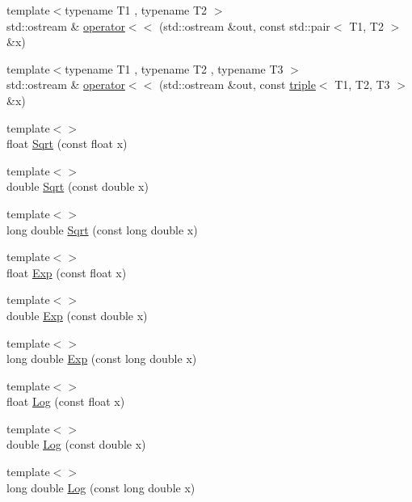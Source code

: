 \begin{DoxyCompactItemize}
\item 
{\footnotesize template$<$typename T1 , typename T2 $>$ }\\std\+::ostream \& \hyperlink{contrafold_2_utilities_8ipp_a90330689e9660b8e3f4720211e99792a}{operator$<$$<$} (std\+::ostream \&out, const std\+::pair$<$ T1, T2 $>$ \&x)
\item 
{\footnotesize template$<$typename T1 , typename T2 , typename T3 $>$ }\\std\+::ostream \& \hyperlink{contrafold_2_utilities_8ipp_a3d51e9fcc4b545214345eef0c3ecf3e8}{operator$<$$<$} (std\+::ostream \&out, const \hyperlink{structtriple}{triple}$<$ T1, T2, T3 $>$ \&x)
\item 
{\footnotesize template$<$$>$ }\\float \hyperlink{contrafold_2_utilities_8ipp_a8b3962d75e7f29b34971181b12f527da}{Sqrt} (const float x)
\item 
{\footnotesize template$<$$>$ }\\double \hyperlink{contrafold_2_utilities_8ipp_ae9fab1428944ba857cc4ceb4897c93a0}{Sqrt} (const double x)
\item 
{\footnotesize template$<$$>$ }\\long double \hyperlink{contrafold_2_utilities_8ipp_a819ff1297b5800fc0810ce49766400d9}{Sqrt} (const long double x)
\item 
{\footnotesize template$<$$>$ }\\float \hyperlink{contrafold_2_utilities_8ipp_a29d0fd4bdf4dc3019da5511afc7e3f92}{Exp} (const float x)
\item 
{\footnotesize template$<$$>$ }\\double \hyperlink{contrafold_2_utilities_8ipp_ad78e475abfaf2452e00e9f05199034f3}{Exp} (const double x)
\item 
{\footnotesize template$<$$>$ }\\long double \hyperlink{contrafold_2_utilities_8ipp_a41272df091ca16294c88ca5e8e4c6dfe}{Exp} (const long double x)
\item 
{\footnotesize template$<$$>$ }\\float \hyperlink{contrafold_2_utilities_8ipp_ad267663990a55841bfeaa3c5a05f8512}{Log} (const float x)
\item 
{\footnotesize template$<$$>$ }\\double \hyperlink{contrafold_2_utilities_8ipp_a12cdc7ac8943e306f00e1608e1d5b92d}{Log} (const double x)
\item 
{\footnotesize template$<$$>$ }\\long double \hyperlink{contrafold_2_utilities_8ipp_a0c97d604a39ae6416b2cd3cb9ac3e72a}{Log} (const long double x)

\end{DoxyCompactItemize}
